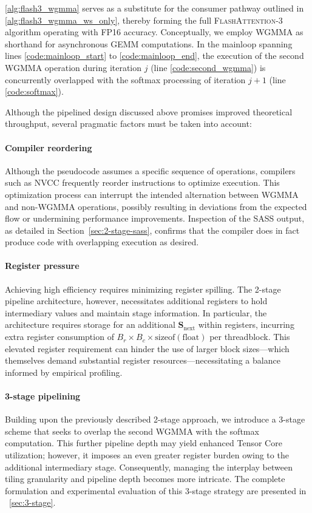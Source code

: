 \cref{alg:flash3_wgmma} serves as a substitute for the consumer pathway outlined in \cref{alg:flash3_wgmma_ws_only}, thereby forming the full \textsc{FlashAttention-3} algorithm operating with FP16 accuracy. Conceptually, we employ WGMMA as shorthand for asynchronous GEMM computations. In the mainloop spanning lines \ref{code:mainloop_start} to \ref{code:mainloop_end}, the execution of the second WGMMA operation during iteration $j$ (line \ref{code:second_wgmma}) is concurrently overlapped with the softmax processing of iteration $j+1$ (line \ref{code:softmax}).

Although the pipelined design discussed above promises improved theoretical throughput, several pragmatic factors must be taken into account:

\paragraph{Compiler reordering} Although the pseudocode assumes a specific sequence of operations, compilers such as NVCC frequently reorder instructions to optimize execution. This optimization process can interrupt the intended alternation between WGMMA and non-WGMMA operations, possibly resulting in deviations from the expected flow or undermining performance improvements. Inspection of the SASS output, as detailed in Section~\ref{sec:2-stage-sass}, confirms that the compiler does in fact produce code with overlapping execution as desired.

\paragraph{Register pressure} Achieving high efficiency requires minimizing register spilling. The 2-stage pipeline architecture, however, necessitates additional registers to hold intermediary values and maintain stage information. In particular, the architecture requires storage for an additional $\mathbf{S}_{\mathrm{next}}$ within registers, incurring extra register consumption of $B_r \times B_c \times \text{sizeof}(\text{float})$ per threadblock. This elevated register requirement can hinder the use of larger block sizes—which themselves demand substantial register resources—necessitating a balance informed by empirical profiling.

\paragraph{3-stage pipelining} Building upon the previously described 2-stage approach, we introduce a 3-stage scheme that seeks to overlap the second WGMMA with the softmax computation. This further pipeline depth may yield enhanced Tensor Core utilization; however, it imposes an even greater register burden owing to the additional intermediary stage. Consequently, managing the interplay between tiling granularity and pipeline depth becomes more intricate. The complete formulation and experimental evaluation of this 3-stage strategy are presented in ~\cref{sec:3-stage}.

